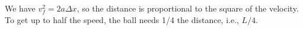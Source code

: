 We have $v_f^2=2a\Delta x$, so the distance is
proportional to the square of the velocity. To get up to
half the speed, the ball needs 1/4 the distance, i.e., $L/4$.



